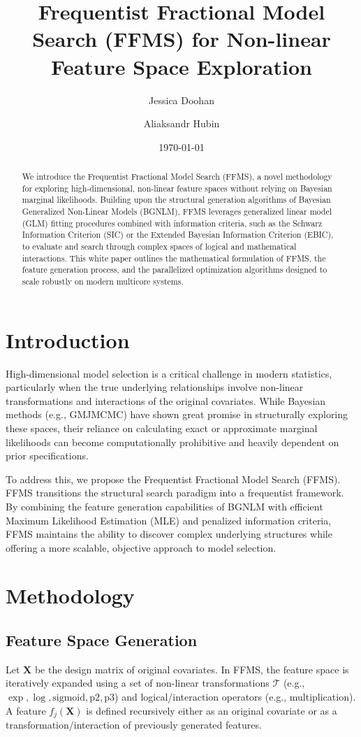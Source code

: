 \documentclass[12pt,a4paper]{article}
\title{Frequentist Fractional Model Search (FFMS) for Non-linear Feature Space Exploration}
\author[1]{Jessica Doohan}
\author[2]{Aliaksandr Hubin}
\affil[1]{Independent Researcher}
\affil[2]{Department of Mathematics, University of Oslo}
\date{\today}
\begin{document}
\maketitle

\begin{abstract}
We introduce the Frequentist Fractional Model Search (FFMS), a novel methodology for exploring high-dimensional, non-linear feature spaces without relying on Bayesian marginal likelihoods. Building upon the structural generation algorithms of Bayesian Generalized Non-Linear Models (BGNLM), FFMS leverages generalized linear model (GLM) fitting procedures combined with information criteria, such as the Schwarz Information Criterion (SIC) or the Extended Bayesian Information Criterion (EBIC), to evaluate and search through complex spaces of logical and mathematical interactions. This white paper outlines the mathematical formulation of FFMS, the feature generation process, and the parallelized optimization algorithms designed to scale robustly on modern multicore systems.
\end{abstract}

\section{Introduction}

High-dimensional model selection is a critical challenge in modern statistics, particularly when the true underlying relationships involve non-linear transformations and interactions of the original covariates. While Bayesian methods (e.g., GMJMCMC) have shown great promise in structurally exploring these spaces, their reliance on calculating exact or approximate marginal likelihoods can become computationally prohibitive and heavily dependent on prior specifications. 

To address this, we propose the Frequentist Fractional Model Search (FFMS). FFMS transitions the structural search paradigm into a frequentist framework. By combining the feature generation capabilities of BGNLM with efficient Maximum Likelihood Estimation (MLE) and penalized information criteria, FFMS maintains the ability to discover complex underlying structures while offering a more scalable, objective approach to model selection.

\section{Methodology}

\subsection{Feature Space Generation}
Let $\mathbf{X}$ be the design matrix of original covariates. In FFMS, the feature space is iteratively expanded using a set of non-linear transformations $\mathcal{T}$ (e.g., $\exp, \log, \text{sigmoid}, \text{p2}, \text{p3}$) and logical/interaction operators (e.g., multiplication). A feature $f_j(\mathbf{X})$ is defined recursively either as an original covariate or as a transformation/interaction of previously generated features. 
\end{document}

